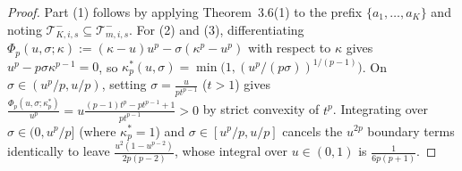 \documentclass[11pt,a4paper]{article}
\theoremstyle{remark}
\begin{document}
\begin{proof}
Part (1) follows by applying Theorem~3.6(1) to the prefix $\{a_1, \dots, a_K\}$ and noting $\mathcal{T}_{K,i,s}^- \subseteq \mathcal{T}_{m,i,s}^-$. For (2) and (3), differentiating $\Phi_p(u, \sigma; \kappa) := (\kappa - u)u^p - \sigma(\kappa^p - u^p)$ with respect to $\kappa$ gives $u^p - p\sigma \kappa^{p-1} = 0$, so $\kappa_p^*(u, \sigma) = \min\bigl(1, (u^p/(p\sigma))^{1/(p-1)}\bigr)$. On $\sigma \in (u^p/p, u/p)$, setting $\sigma = \frac{u}{p t^{p-1}}$ ($t > 1$) gives $\frac{\Phi_p(u, \sigma; \kappa_p^*)}{u^p} = u\frac{(p-1)t^p - p t^{p-1} + 1}{p t^{p-1}} > 0$ by strict convexity of $t^p$. Integrating over $\sigma \in (0, u^p/p]$ (where $\kappa_p^* = 1$) and $\sigma \in [u^p/p, u/p]$ cancels the $u^{2p}$ boundary terms identically to leave $\frac{u^2(1 - u^{p-2})}{2p(p - 2)}$, whose integral over $u \in (0, 1)$ is $\frac{1}{6p(p+1)}$.
\end{proof}
\end{document}

